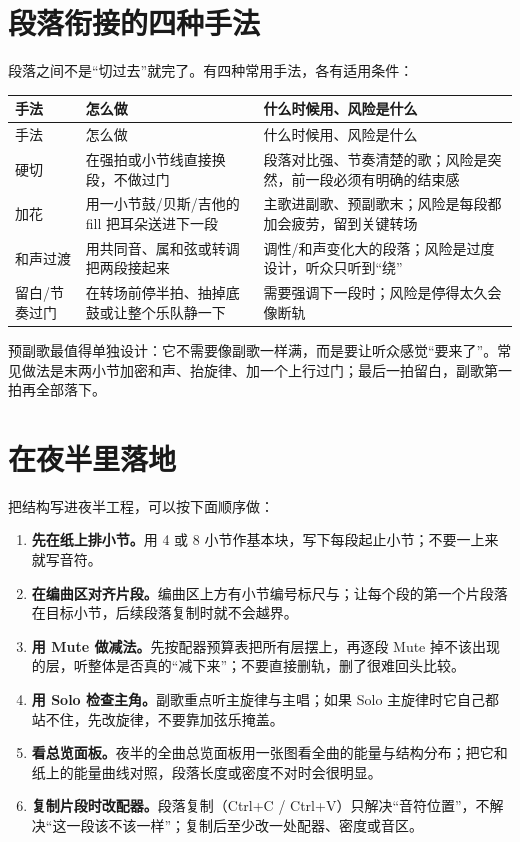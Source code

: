 \section{段落衔接的四种手法}
\label{sec:transitions}

段落之间不是“切过去”就完了。有四种常用手法，各有适用条件：

\begin{longtable}{p{}p{}p{}}
\toprule
手法 & 怎么做 & 什么时候用、风险是什么 \\
\midrule
\endfirsthead
\toprule
手法 & 怎么做 & 什么时候用、风险是什么 \\
\midrule
\endhead
硬切 & 在强拍或小节线直接换段，不做过门 & 段落对比强、节奏清楚的歌；风险是突然，前一段必须有明确的结束感 \\
加花 & 用一小节鼓/贝斯/吉他的 fill 把耳朵送进下一段 & 主歌进副歌、预副歌末；风险是每段都加会疲劳，留到关键转场 \\
和声过渡 & 用共同音、属和弦或转调把两段接起来 & 调性/和声变化大的段落；风险是过度设计，听众只听到“绕” \\
留白/节奏过门 & 在转场前停半拍、抽掉底鼓或让整个乐队静一下 & 需要强调下一段时；风险是停得太久会像断轨 \\
\bottomrule
\end{longtable}

预副歌最值得单独设计：它不需要像副歌一样满，而是要让听众感觉“要来了”。常见做法是末两小节加密和声、抬旋律、加一个上行过门；最后一拍留白，副歌第一拍再全部落下。

\section{在夜半里落地}
\label{sec:structure-yeban}

把结构写进夜半工程，可以按下面顺序做：

\begin{enumerate}
\item \textbf{先在纸上排小节。}用 4 或 8 小节作基本块，写下每段起止小节；不要一上来就写音符。
\item \textbf{在编曲区对齐片段。}编曲区上方有小节编号标尺与；让每个段的第一个片段落在目标小节，后续段落复制时就不会越界。
\item \textbf{用 Mute 做减法。}先按配器预算表把所有层摆上，再逐段 Mute 掉不该出现的层，听整体是否真的“减下来”；不要直接删轨，删了很难回头比较。
\item \textbf{用 Solo 检查主角。}副歌重点听主旋律与主唱；如果 Solo 主旋律时它自己都站不住，先改旋律，不要靠加弦乐掩盖。
\item \textbf{看总览面板。}夜半的全曲总览面板用一张图看全曲的能量与结构分布；把它和纸上的能量曲线对照，段落长度或密度不对时会很明显。
\item \textbf{复制片段时改配器。}段落复制（Ctrl+C / Ctrl+V）只解决“音符位置”，不解决“这一段该不该一样”；复制后至少改一处配器、密度或音区。
\end{enumerate}

